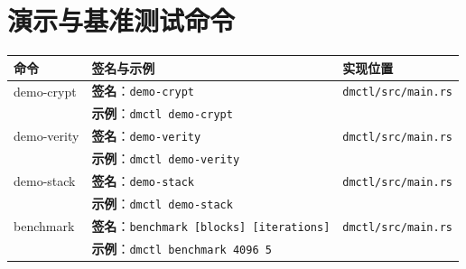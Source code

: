 \section*{演示与基准测试命令}

\begin{longtable}{|p{}|p{}|p{}|}
\hline
\textbf{命令} & \textbf{签名与示例} & \textbf{实现位置} \\
\hline
\endhead
demo-crypt & \textbf{签名}：\texttt{demo-crypt} & \texttt{dmctl/src/main.rs} \\
 & \textbf{示例}：\texttt{dmctl demo-crypt} & \\
\hline
demo-verity & \textbf{签名}：\texttt{demo-verity} & \texttt{dmctl/src/main.rs} \\
 & \textbf{示例}：\texttt{dmctl demo-verity} & \\
\hline
demo-stack & \textbf{签名}：\texttt{demo-stack} & \texttt{dmctl/src/main.rs} \\
 & \textbf{示例}：\texttt{dmctl demo-stack} & \\
\hline
benchmark & \textbf{签名}：\texttt{benchmark [blocks] [iterations]} & \texttt{dmctl/src/main.rs} \\
 & \textbf{示例}：\texttt{dmctl benchmark 4096 5} & \\
\hline
\end{longtable}